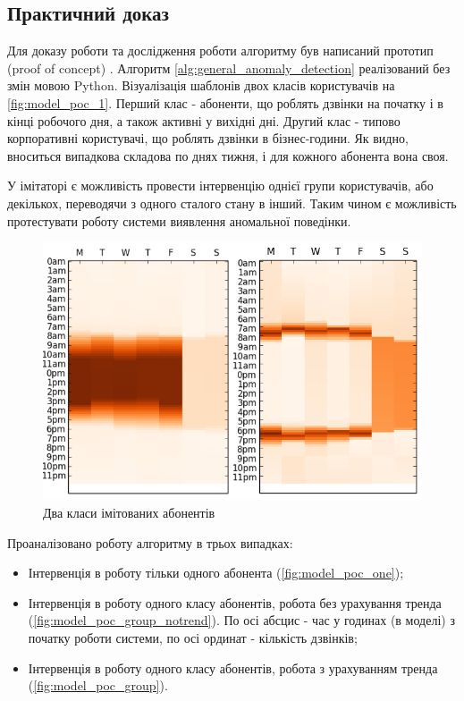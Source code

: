 \newpage
{}

\subsection{Практичний доказ}
\label{poc}
Для доказу роботи та дослідження роботи алгоритму був написаний прототип (proof of concept) \cite{rader2014cdr}. Алгоритм \ref{alg:general_anomaly_detection} реалізований без змін мовою Python. Візуалізація шаблонів двох класів користувачів на \autoref{fig:model_poc_1}. Перший клас - абоненти, що роблять дзвінки на початку і в кінці робочого дня, а також активні у вихідні дні. Другий клас - типово корпоративні користувачі, що роблять дзвінки в бізнес-години. Як видно, вноситься випадкова складова по днях тижня, і для кожного абонента вона своя.

У імітаторі є можливість провести інтервенцію однієї групи користувачів, або декількох, переводячи з одного сталого стану в інший. Таким чином є можливість протестувати роботу системи виявлення аномальної поведінки.

\begin{figure}[h]
        \begin{center}
            \includegraphics[scale=0.4]{resources/model_1_2.png}
        \end{center}
        \caption{Два класи імітованих абонентів}
        \label{fig:model_poc_1}
\end{figure}

Проаналізовано роботу алгоритму в трьох випадках:
\begin{itemize}
  \item Інтервенція в роботу тільки одного абонента (\autoref{fig:model_poc_one});
  \item Інтервенція в роботу одного класу абонентів, робота без урахування тренда (\autoref{fig:model_poc_group_notrend}). По осі абсцис - час у годинах (в моделі) з початку роботи системи, по осі ординат - кількість дзвінків;
  \item Інтервенція в роботу одного класу абонентів, робота з урахуванням тренда (\autoref{fig:model_poc_group}).
\end{itemize}


